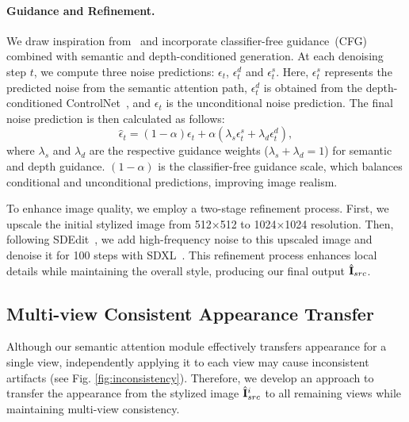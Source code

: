 \paragraph{Guidance and Refinement.} 
We draw inspiration from~\cite{ho2021cfg,alaluf2024cross} and incorporate classifier-free guidance~(CFG) combined with semantic and depth-conditioned generation. At each denoising step $t$, we compute three noise predictions: $\epsilon_t$, $\epsilon_t^{d}$ and $\epsilon_t^{s}$. Here, $\epsilon_t^{s}$ represents the predicted noise from the semantic attention path, $\epsilon_t^{d}$ is obtained from the depth-conditioned ControlNet~\cite{zhang2023adding}, and $\epsilon_t$ is the unconditional noise prediction. The final noise prediction is then calculated as follows: 
\begin{equation}
\hat{\epsilon}_t = (1 - \alpha) \epsilon_t + \alpha (\lambda_s\epsilon_t^s + \lambda_d\epsilon_t^d),
\end{equation}
where $\lambda_s$ and $\lambda_d$ are the respective guidance weights ($\lambda_s+\lambda_d=1$) for semantic and depth guidance. $(1 - \alpha)$ is the classifier-free guidance scale, which balances conditional and unconditional predictions, improving image realism.

To enhance image quality, we employ a two-stage refinement process. First, we upscale the initial stylized image from 512×512 to 1024×1024 resolution. Then, following SDEdit~\cite{meng2022sdedit}, we add high-frequency noise to this upscaled image and denoise it for 100 steps with SDXL~\cite{podell2024sdxl}. This refinement process enhances local details while maintaining the overall style, producing our final output $\hat{\mathbf{I}}_{src}$.





\subsection{Multi-view Consistent Appearance Transfer}\label{sec:multiview_style_propagation}
Although our semantic attention module effectively transfers appearance for a single view, independently applying it to each view may cause inconsistent artifacts (see Fig. \ref{fig:inconsistency}). Therefore, we develop an approach to transfer the appearance from the stylized image $\hat{\mathbf{I}}_{src}^i$ to all remaining views while maintaining multi-view consistency.

